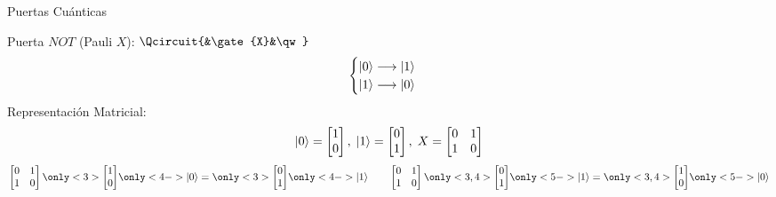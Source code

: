 \documentclass[10pt,compress]{beamer}
\begin{document}
\begin{frame}{Puertas Cuánticas}

Puerta $NOT$ (Pauli $X$): \qquad $\Qcircuit{&\gate{X}&\qw}$
\begin{equation}
\begin{cases}
\ket{0} \longrightarrow \ket{1} \\
\ket{1} \longrightarrow \ket{0}
\end{cases}
\end{equation}
\pause
Representación Matricial:
\begin{equation}
\ket{0} =
\begin{bmatrix}
1 \\ 0
\end{bmatrix}, \;
\ket{1} =
\begin{bmatrix}
0 \\ 1
\end{bmatrix}, \;
X =
\begin{bmatrix}
0 & 1 \\
1 & 0 
\end{bmatrix}
\end{equation}
\pause
\begin{equation}
\begin{bmatrix}
0 & 1 \\
1 & 0 
\end{bmatrix}
\only<3>{
\begin{bmatrix}
1 \\ 0
\end{bmatrix}}
\only<4->{\ket{0}} =
\only<3>{
\begin{bmatrix}
0 \\ 1
\end{bmatrix}}
\only<4->{\ket{1}}
\qquad
\begin{bmatrix}
0 & 1 \\
1 & 0 
\end{bmatrix}
\only<3,4>{
\begin{bmatrix}
0 \\ 1
\end{bmatrix}}
\only<5->{\ket{1}} =
\only<3,4>{
\begin{bmatrix}
1 \\ 0
\end{bmatrix}}
\only<5->{\ket{0}}
\end{equation}

\end{frame}
\end{document}
